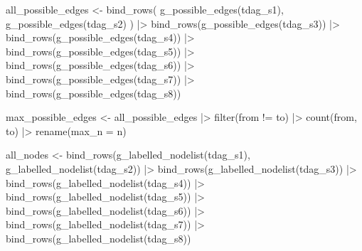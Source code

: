 \documentclass[
  letterpaper,
  DIV=11,
  numbers=noendperiod]{scrartcl}
\newenvironment{Shaded}{\begin{snugshade}}{\end{snugshade}}
\newcommand{\AttributeTok}[1]{\textcolor[rgb]{0.40,0.45,0.13}{#1}}
\newcommand{\FunctionTok}[1]{\textcolor[rgb]{0.28,0.35,0.67}{#1}}
\newcommand{\NormalTok}[1]{\textcolor[rgb]{0.00,0.23,0.31}{#1}}
\newcommand{\OtherTok}[1]{\textcolor[rgb]{0.00,0.23,0.31}{#1}}
\newcommand{\SpecialCharTok}[1]{\textcolor[rgb]{0.37,0.37,0.37}{#1}}
\begin{document}
\begin{Shaded}
\begin{Highlighting}[]
\NormalTok{all\_possible\_edges }\OtherTok{\textless{}{-}} \FunctionTok{bind\_rows}\NormalTok{(}
    \FunctionTok{g\_possible\_edges}\NormalTok{(tdag\_s1),}
    \FunctionTok{g\_possible\_edges}\NormalTok{(tdag\_s2)}
\NormalTok{) }\SpecialCharTok{|\textgreater{}} 
    \FunctionTok{bind\_rows}\NormalTok{(}\FunctionTok{g\_possible\_edges}\NormalTok{(tdag\_s3)) }\SpecialCharTok{|\textgreater{}} 
    \FunctionTok{bind\_rows}\NormalTok{(}\FunctionTok{g\_possible\_edges}\NormalTok{(tdag\_s4)) }\SpecialCharTok{|\textgreater{}} 
    \FunctionTok{bind\_rows}\NormalTok{(}\FunctionTok{g\_possible\_edges}\NormalTok{(tdag\_s5)) }\SpecialCharTok{|\textgreater{}} 
    \FunctionTok{bind\_rows}\NormalTok{(}\FunctionTok{g\_possible\_edges}\NormalTok{(tdag\_s6)) }\SpecialCharTok{|\textgreater{}} 
    \FunctionTok{bind\_rows}\NormalTok{(}\FunctionTok{g\_possible\_edges}\NormalTok{(tdag\_s7)) }\SpecialCharTok{|\textgreater{}} 
    \FunctionTok{bind\_rows}\NormalTok{(}\FunctionTok{g\_possible\_edges}\NormalTok{(tdag\_s8)) }

\NormalTok{max\_possible\_edges }\OtherTok{\textless{}{-}}\NormalTok{ all\_possible\_edges }\SpecialCharTok{|\textgreater{}} 
    \FunctionTok{filter}\NormalTok{(from }\SpecialCharTok{!=}\NormalTok{ to) }\SpecialCharTok{|\textgreater{}} 
    \FunctionTok{count}\NormalTok{(from, to) }\SpecialCharTok{|\textgreater{}} 
    \FunctionTok{rename}\NormalTok{(}\AttributeTok{max\_n =}\NormalTok{ n)}

\NormalTok{all\_nodes }\OtherTok{\textless{}{-}} \FunctionTok{bind\_rows}\NormalTok{(}\FunctionTok{g\_labelled\_nodelist}\NormalTok{(tdag\_s1),}
                       \FunctionTok{g\_labelled\_nodelist}\NormalTok{(tdag\_s2)) }\SpecialCharTok{|\textgreater{}} 
    \FunctionTok{bind\_rows}\NormalTok{(}\FunctionTok{g\_labelled\_nodelist}\NormalTok{(tdag\_s3)) }\SpecialCharTok{|\textgreater{}} 
    \FunctionTok{bind\_rows}\NormalTok{(}\FunctionTok{g\_labelled\_nodelist}\NormalTok{(tdag\_s4)) }\SpecialCharTok{|\textgreater{}} 
    \FunctionTok{bind\_rows}\NormalTok{(}\FunctionTok{g\_labelled\_nodelist}\NormalTok{(tdag\_s5)) }\SpecialCharTok{|\textgreater{}} 
    \FunctionTok{bind\_rows}\NormalTok{(}\FunctionTok{g\_labelled\_nodelist}\NormalTok{(tdag\_s6)) }\SpecialCharTok{|\textgreater{}} 
    \FunctionTok{bind\_rows}\NormalTok{(}\FunctionTok{g\_labelled\_nodelist}\NormalTok{(tdag\_s7)) }\SpecialCharTok{|\textgreater{}} 
    \FunctionTok{bind\_rows}\NormalTok{(}\FunctionTok{g\_labelled\_nodelist}\NormalTok{(tdag\_s8)) }


\end{Highlighting}
\end{Shaded}
\end{document}
